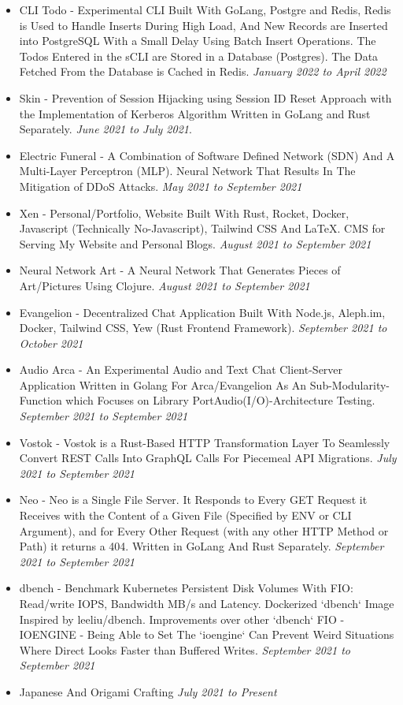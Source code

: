 \documentclass{myresume}
\begin{document}
       \begin{itemize}
       	\item CLI Todo -  Experimental CLI Built With GoLang, Postgre and Redis, Redis is Used to Handle Inserts During High Load, And New Records are Inserted into PostgreSQL With a Small Delay Using Batch Insert Operations. The Todos Entered in the sCLI are Stored in a Database (Postgres). The Data Fetched From the Database is Cached in Redis. \textit{January 2022 to April 2022}
       	\item Skin - Prevention of Session Hijacking using Session ID Reset Approach with the Implementation of Kerberos Algorithm Written in GoLang and Rust Separately. \textit{June 2021 to July 2021}.
     	\item Electric Funeral - A Combination of Software Defined Network (SDN) And A Multi-Layer Perceptron (MLP). Neural Network That Results In The Mitigation of DDoS Attacks. \textit{May 2021 to September 2021}
     	\item Xen - Personal/Portfolio, Website Built With Rust, Rocket, Docker, Javascript (Technically No-Javascript), Tailwind CSS And \LaTeX{}. CMS for Serving My Website and Personal Blogs. 
     	\textit{August 2021 to September 2021}
     	\item Neural Network Art -  A Neural Network That Generates Pieces of Art/Pictures Using Clojure. \textit{August 2021 to September 2021}
     	\item Evangelion - Decentralized Chat Application Built With Node.js, Aleph.im, Docker, Tailwind CSS, Yew (Rust Frontend Framework). \textit{September 2021 to October 2021}
     	\item Audio Arca - An Experimental Audio and Text Chat Client-Server Application Written in Golang For Arca/Evangelion As An Sub-Modularity-Function which Focuses on Library PortAudio(I/O)-Architecture Testing. \textit{September 2021 to September 2021}
     	\item Vostok - Vostok is a Rust-Based HTTP Transformation Layer To Seamlessly Convert REST Calls Into GraphQL Calls For Piecemeal API Migrations. \textit {July 2021 to September 2021}
     	\item Neo - Neo is a Single File Server. It Responds to Every GET Request it Receives with the Content of a Given File (Specified by ENV or CLI Argument), and for Every Other Request (with any other HTTP Method or Path) it returns a 404. Written in GoLang And Rust Separately. \textit {September 2021 to September 2021}
     	\item dbench - Benchmark Kubernetes Persistent Disk Volumes With FIO: Read/write IOPS, Bandwidth MB/s and Latency. Dockerized `dbench` Image Inspired by leeliu/dbench. Improvements over other `dbench` FIO - IOENGINE - Being Able to Set The `ioengine` Can Prevent Weird Situations Where Direct Looks Faster than Buffered Writes. \textit{September 2021 to September 2021}    	
       \end{itemize}   
 
        \begin{itemize}
                \item Japanese And Origami Crafting \textit{July 2021 to Present}
        \end{itemize}
\end{document}
